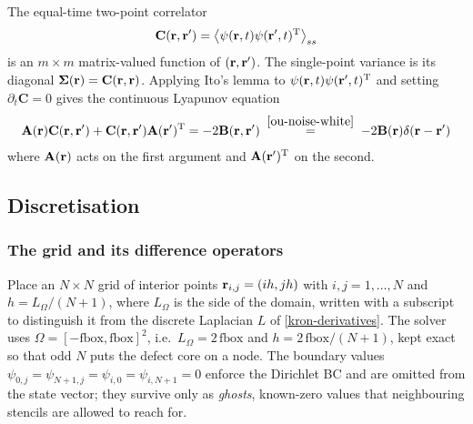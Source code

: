 \documentclass[a5paper]{article}
\begin{document}
The equal-time two-point correlator
\begin{align}
    \mathbf{C}(\mathbf{r},\mathbf{r}') = \left\langle \psi(\mathbf{r},t) \psi(\mathbf{r}',t)^{\mathrm{T}}\right\rangle_{ss}
\end{align}
is an $m\times m$ matrix-valued function of $(\mathbf{r},\mathbf{r}')$. The single-point variance is its diagonal $\boldsymbol\Sigma(\mathbf{r}) = \mathbf{C}(\mathbf{r},\mathbf{r})$. Applying Ito's lemma to $\psi(\mathbf{r},t)\psi(\mathbf{r}',t)^{\mathrm{T}}$ and setting $\partial_t\mathbf{C}=0$ gives the continuous Lyapunov equation
\begin{align}
    \label{lyapunov-continuous}
    \mathbf{A}(\mathbf{r})\mathbf{C}(\mathbf{r},\mathbf{r}') + \mathbf{C}(\mathbf{r},\mathbf{r}')\mathbf{A}(\mathbf{r}')^{\mathrm{T}} = -2\mathbf{B}(\mathbf{r},\mathbf{r}')
    \;\overset{\eqref{ou-noise-white}}{=}\; -2\mathbf{B}(\mathbf{r})\delta(\mathbf{r}-\mathbf{r}')
\end{align}
where $\mathbf{A}(\mathbf{r})$ acts on the first argument and $\mathbf{A}(\mathbf{r}')^{\mathrm{T}}$ on the second.

\subsection{Discretisation}

\subsubsection{The grid and its difference operators}
\label{sec-fd-operators}
Place an $N\times N$ grid of interior points $\mathbf{r}_{i,j}=(ih, jh)$ with $i,j=1,\dots,N$ and $h=L_\Omega/(N+1)$, where $L_\Omega$ is the side of the domain, written with a subscript to distinguish it from the discrete Laplacian $L$ of \eqref{kron-derivatives}. The solver uses $\Omega = [-\mathrm{fbox},\mathrm{fbox}]^2$, i.e.\ $L_\Omega = 2\,\mathrm{fbox}$ and $h = 2\,\mathrm{fbox}/(N+1)$, kept exact so that odd $N$ puts the defect core on a node. The boundary values $\psi_{0,j}=\psi_{N+1,j}=\psi_{i,0}=\psi_{i,N+1}=0$ enforce the Dirichlet BC and are omitted from the state vector; they survive only as \emph{ghosts}, known-zero values that neighbouring stencils are allowed to reach for.
\end{document}
